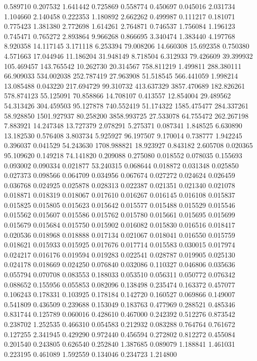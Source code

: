 0.589710
0.207532
1.641442
0.725869
0.558774
0.450697
0.045016
2.031734
1.104660
2.140458
0.222353
1.180892
2.662262
0.499987
0.111217
0.181071
0.775423
1.381380
2.772698
1.614261
2.764871
0.746537
1.756084
1.196123
0.745471
0.765272
2.893864
9.966268
0.866695
3.340474
1.383440
4.197768
8.920358
14.117145
3.171118
6.253394
79.008206
14.660308
15.692358
0.750380
4.571663
17.044946
11.186204
31.948149
8.718504
6.312933
79.426609
39.399932
105.469457
143.765542
10.262730
20.314567
758.811219
1.499811
288.380111
66.909033
534.002038
252.787419
27.963908
51.518545
566.441059
1.998214
13.085488
0.043220
217.694729
99.310732
413.637329
3857.470689
182.826261
578.874123
55.125091
70.858866
14.708107
0.413557
12.854004
29.489562
54.313426
304.459503
95.127878
740.552419
51.174322
1585.475477
284.337261
58.928850
1501.927937
80.258200
3858.993725
27.533078
64.755472
262.267198
7.883921
14.247348
13.727379
2.078291
5.275371
0.087341
1.848525
6.630890
13.182530
0.576408
3.803734
5.925927
96.197507
9.170014
0.738777
1.942245
0.396037
0.041529
54.243630
1708.988821
18.923927
0.843182
2.605708
0.020365
95.109620
0.149218
74.141820
0.209088
0.275080
0.018552
0.078035
0.155693
0.093002
0.090334
0.021877
53.240315
0.068644
0.018872
0.031348
0.025850
0.027373
0.098566
0.064709
0.034956
0.067674
0.027272
0.024624
0.026459
0.036768
0.024925
0.025878
0.028313
0.022387
0.021351
0.021340
0.021078
0.018871
0.018319
0.018067
0.017610
0.016267
0.016145
0.016108
0.015837
0.015825
0.015805
0.015623
0.015642
0.015577
0.015488
0.015529
0.015546
0.015562
0.015607
0.015586
0.015762
0.015780
0.015661
0.015695
0.015699
0.015679
0.015684
0.015750
0.015902
0.016082
0.015830
0.016516
0.018417
0.020536
0.018968
0.018888
0.017134
0.021067
0.018041
0.016550
0.015759
0.018621
0.015933
0.015925
0.017676
0.017714
0.015583
0.030015
0.017974
0.024217
0.016176
0.019594
0.019283
0.022541
0.028787
0.019905
0.025130
0.024178
0.018669
0.024250
0.076840
0.032086
0.110327
0.046806
0.035636
0.055794
0.070708
0.083553
0.188033
0.053510
0.056311
0.050772
0.076342
0.088652
0.155956
0.055853
0.082096
0.138498
0.235474
0.163372
0.457077
0.106243
0.178331
0.103925
0.178184
0.142720
0.160527
0.069866
0.149007
0.541809
0.436509
0.239688
0.153049
0.183763
0.477969
0.288521
0.485346
0.831744
0.125789
0.060016
0.428610
0.467000
0.242392
0.512276
0.873542
0.238702
1.252535
0.466310
0.054583
0.212932
0.083288
0.764764
0.761672
0.127255
2.341945
0.429290
0.972440
0.456594
0.272802
0.812272
0.455084
0.201540
0.243805
0.626540
0.252840
1.387685
0.089079
1.188841
1.461031
0.223195
0.461089
1.592559
0.134046
0.234723
1.214800
